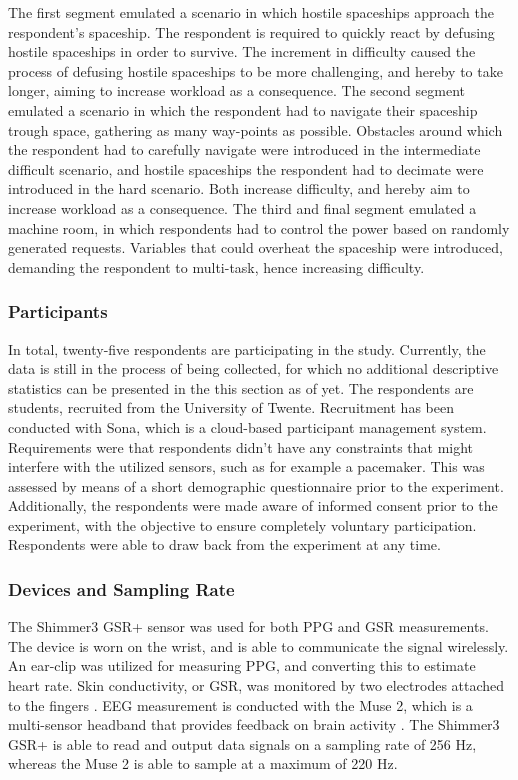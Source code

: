 \documentclass[12pt]{article}
\begin{document}
The first segment emulated a scenario in which hostile spaceships approach the respondent's spaceship. The respondent is required to  quickly react by defusing hostile spaceships in order to survive. The increment in difficulty caused the process of defusing hostile spaceships to be more challenging, and hereby to take longer,  aiming to increase workload as a consequence. The second segment emulated a scenario in which the respondent had to navigate their spaceship trough space, gathering as many way-points as possible. Obstacles around which the respondent had to carefully navigate were introduced in the intermediate difficult scenario, and hostile spaceships the respondent had to decimate were introduced in the hard scenario. Both increase difficulty, and hereby aim to increase workload as a consequence. The third and final segment emulated a machine room, in which respondents had to control the power based on randomly generated requests. Variables that could overheat the spaceship were introduced, demanding the respondent to multi-task, hence increasing difficulty. 

\subsubsection{Participants}
In total, twenty-five respondents are participating in the study. Currently, the data is still in the process of being collected, for which no additional descriptive statistics can be presented in the this section as of yet. The respondents are students, recruited from the University of Twente. Recruitment has been conducted with Sona, which is a cloud-based participant management system. Requirements were that respondents didn't have any constraints that might interfere with the utilized sensors, such as for example a pacemaker. This was assessed by means of a short demographic questionnaire prior to the experiment. Additionally, the respondents were made aware of informed consent prior to the experiment, with the objective to ensure completely voluntary participation. Respondents were able to draw back from the experiment at any time. 

\subsubsection{Devices and Sampling Rate}
The Shimmer3 GSR+ sensor was used for both PPG and GSR measurements. The device is worn on the wrist, and is able to communicate the signal wirelessly. An ear-clip was utilized for measuring PPG, and converting this to estimate heart rate. Skin conductivity, or GSR, was monitored by two electrodes attached to the fingers \cite{shimmer}. EEG measurement is conducted with the Muse 2, which is a multi-sensor headband that provides feedback on brain activity \cite{muse}. The Shimmer3 GSR+ is able to read and output data signals on a sampling rate of 256 Hz, whereas the Muse 2 is able to sample at a maximum of 220 Hz. 
\end{document}
